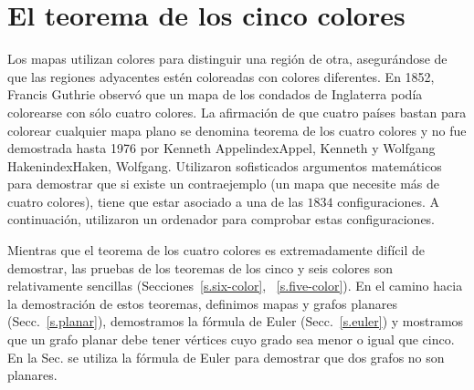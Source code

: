 
\chapter{El teorema de los cinco colores}\label{c.five}


Los mapas utilizan colores para distinguir una región de otra, asegurándose de que las regiones adyacentes estén coloreadas con colores diferentes. En 1852, Francis Guthrie observó que un mapa de los condados de Inglaterra podía colorearse con sólo cuatro colores. La afirmación de que cuatro países bastan para colorear cualquier mapa plano se denomina teorema de los cuatro colores y no fue demostrada hasta 1976 por Kenneth Appelindex{Appel, Kenneth} y Wolfgang Hakenindex{Haken, Wolfgang}. Utilizaron sofisticados argumentos matemáticos para demostrar que si existe un contraejemplo (un mapa que necesite más de cuatro colores), tiene que estar asociado a una de las $1834$ configuraciones. A continuación, utilizaron un ordenador para comprobar estas configuraciones.

Mientras que el teorema de los cuatro colores es extremadamente difícil de demostrar, las pruebas de los teoremas de los cinco y seis colores son relativamente sencillas (Secciones~\ref{s.six-color}, ~\ref{s.five-color}). En el camino hacia la demostración de estos teoremas, definimos mapas y grafos planares (Secc.~\ref{s.planar}), demostramos la fórmula de Euler (Secc.~\ref{s.euler}) y mostramos que un grafo planar debe tener vértices cuyo grado sea menor o igual que cinco. En la Sec. se utiliza la fórmula de Euler para demostrar que dos grafos no son planares.

